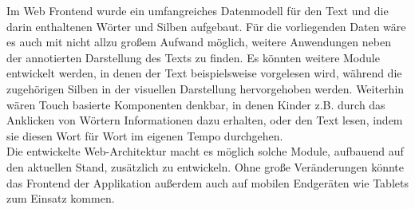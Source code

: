 Im Web Frontend wurde ein umfangreiches Datenmodell für den Text und die darin enthaltenen Wörter und Silben aufgebaut. Für die vorliegenden Daten wäre es auch mit nicht allzu großem Aufwand möglich, weitere Anwendungen neben der annotierten Darstellung des Texts zu finden. Es könnten weitere Module entwickelt werden, in denen der Text beispielsweise vorgelesen wird, während die zugehörigen Silben in der visuellen Darstellung hervorgehoben werden. Weiterhin wären Touch basierte Komponenten denkbar, in denen Kinder z.B. durch das Anklicken von Wörtern Informationen dazu erhalten, oder den Text lesen, indem sie diesen Wort für Wort im eigenen Tempo durchgehen.\\
Die entwickelte Web-Architektur macht es möglich solche Module, aufbauend auf den aktuellen Stand, zusätzlich zu entwickeln. Ohne große Veränderungen könnte das Frontend der Applikation außerdem auch auf mobilen Endgeräten wie Tablets zum Einsatz kommen.